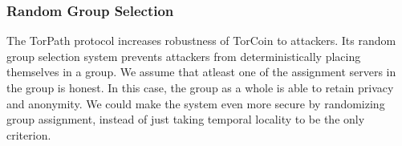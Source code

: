 {\subsubsection{Random Group Selection} The TorPath protocol increases
robustness of TorCoin to attackers. Its random group selection system prevents
attackers from deterministically placing themselves in a group. We assume that
atleast one of the assignment servers in the group is honest. In this case,
the group as a whole is able to retain privacy and anonymity. We could make
the system even more secure by randomizing group assignment, instead of just
taking temporal locality to be the only criterion.








}
